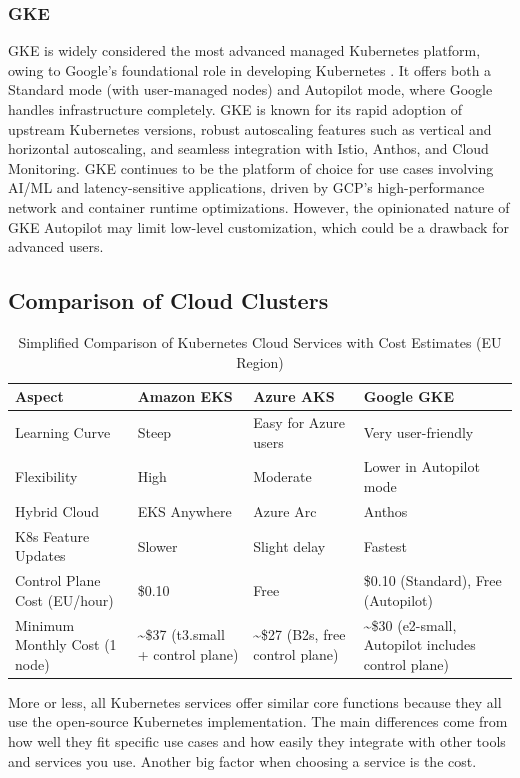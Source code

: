 \subsubsection{GKE}
GKE is widely considered the most advanced managed Kubernetes platform, owing to Google's foundational role in developing Kubernetes \cite{gcp-docs}. It offers both a Standard mode (with user-managed nodes) and Autopilot mode, where Google handles infrastructure completely. GKE is known for its rapid adoption of upstream Kubernetes versions, robust autoscaling features such as vertical and horizontal autoscaling, and seamless integration with Istio, Anthos, and Cloud Monitoring. GKE continues to be the platform of choice for use cases involving AI/ML and latency-sensitive applications, driven by GCP's high-performance network and container runtime optimizations. However, the opinionated nature of GKE Autopilot may limit low-level customization, which could be a drawback for advanced users.

\subsection{Comparison of Cloud Clusters}
\begin{table}[h]
\small
\centering
\begin{tabular}{|p{3cm}|p{3.5cm}|p{3.5cm}|p{3.5cm}|}
\hline
\textbf{Aspect} & \textbf{Amazon EKS} & \textbf{Azure AKS} & \textbf{Google GKE} \\
\hline
Learning Curve & Steep & Easy for Azure users & Very user-friendly \\
Flexibility & High & Moderate & Lower in Autopilot mode \\
Hybrid Cloud & EKS Anywhere & Azure Arc & Anthos \\
K8s Feature Updates & Slower & Slight delay & Fastest \\
Control Plane Cost (EU/hour) & \$0.10 & Free & \$0.10 (Standard), Free (Autopilot) \\
Minimum Monthly Cost (1 node) & \textasciitilde\$37 (t3.small + control plane) & \textasciitilde\$27 (B2s, free control plane) & \textasciitilde\$30 (e2-small, Autopilot includes control plane) \\
\hline
\end{tabular}
\caption{Simplified Comparison of Kubernetes Cloud Services with Cost Estimates (EU Region)}
\end{table}




More or less, all Kubernetes services offer similar core functions because they all use the open-source Kubernetes implementation. The main differences come from how well they fit specific use cases and how easily they integrate with other tools and services you use. Another big factor when choosing a service is the cost.

